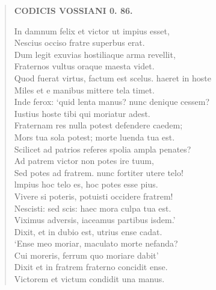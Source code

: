 \documentclass[11pt, a4paper]{report}
\begin{document}
\begin{verse}
    \begin{center} \textbf{CODICIS VOSSIANI 0. 86.} \end{center} \marginpar{[341]} In damnum felix et victor ut impius esset, \\ Nescius occiso fratre superbus erat. \\ Dum legit exuvias hostiliaque arma revellit, \\ Fraternos vultus oraque maesta videt. \\ Quod fuerat virtus, factum est scelus. haeret in hoste \\ Miles et e manibus mittere tela timet. \\ Inde ferox: ‘quid lenta manus? nunc denique cessem? \\ Iustius hoste tibi qui moriatur adest. \\ Fraternam res nulla potest defendere caedem; \\ Mors tua sola potest; morte luenda tua est. \\ Scilicet ad patrios referes spolia ampla penates? \\ Ad patrem victor non potes ire tuum, \\ Sed potes ad fratrem. nunc fortiter utere telo! \\ lmpius hoc telo es, hoc potes esse pius. \\ Vivere si poteris, potuisti occidere fratrem! \\ Nescisti: sed scis: haec mora culpa tua est. \\ Viximus adversis, iaceamus partibus isdem.’ \\ Dixit, et in dubio est, utrius ense cadat. \\ ‘Ense meo moriar, maculato morte nefanda? \\ Cui moreris, ferrum quo moriare dabit’ \\ Dixit et in fratrem fraterno concidit ense. \\ Victorem et victum condidit una manus. \\ 
      \end{verse}
  
\end{document}

